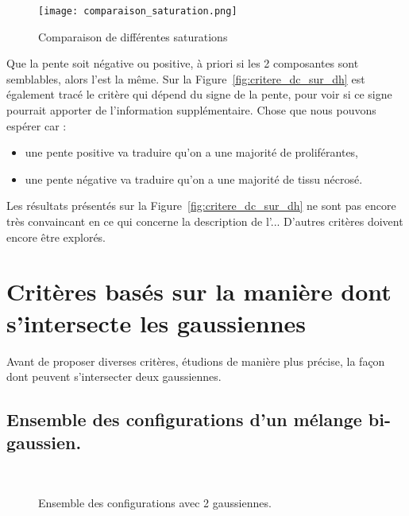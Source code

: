 \documentclass[main.tex]{subfiles}
\begin{document}
\begin{figure}
\centering
\texttt{[image: comparaison\_saturation.png]}
\vspace{-5mm}
\caption{\label{fig:comp_saturation}Comparaison de différentes saturations}
\end{figure}

Que la pente soit négative ou positive, à priori si les 2 composantes sont semblables, alors l'\hetero est la même. Sur la Figure~\ref{fig:critere_dc_sur_dh} est également tracé le critère qui dépend du signe de la pente, pour voir si ce signe pourrait apporter de l'information supplémentaire. Chose que nous pouvons espérer car :
\begin{itemize}
\item une pente positive va traduire qu'on a une majorité de proliférantes,
\item une pente négative va traduire qu'on a une majorité de tissu nécrosé.
\end{itemize}

Les résultats présentés sur la Figure~\ref{fig:critere_dc_sur_dh} ne sont pas encore très convaincant en ce qui concerne la description de l'\hetero... D'autres critères doivent encore être explorés.

\section{Critères basés sur la manière dont s'intersecte les gaussiennes}
Avant de proposer diverses critères, étudions de manière plus précise, la façon dont peuvent s'intersecter deux gaussiennes.

\subsection{Ensemble des configurations d'un mélange bi-gaussien. \label{sec:config_gmm}}
\begin{figure}
\qquad
{}\\
\qquad
{}
\caption{\label{fig:config_intersection_gaussienne}Ensemble des configurations avec 2 gaussiennes.}
\end{figure}
\end{document}
